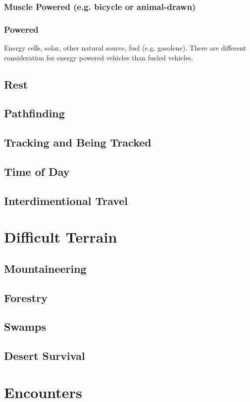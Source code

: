 \documentclass[a4paper,10pt]{book}
\begin{document}
\subsubsection{Muscle Powered (e.g. bicycle or animal-drawn)}
\subsubsection{Powered}
Energy cells, solar, other natural source, fuel (e.g. gasolene). There are
different consideration for energy powered vehicles than fueled vehicles.
\subsection{Rest}
\subsection{Pathfinding}
\subsection{Tracking and Being Tracked}
\subsection{Time of Day}
\subsection{Interdimentional Travel}
\section{Difficult Terrain}
\subsection{Mountaineering}
\subsection{Forestry}
\subsection{Swamps}
\subsection{Desert Survival}
\section{Encounters}
\end{document}
